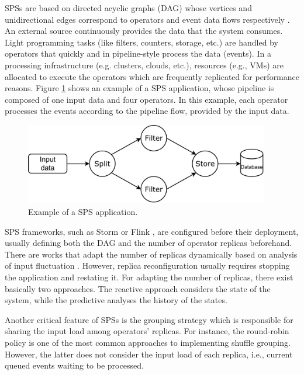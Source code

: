 SPSs are based on directed acyclic graphs (DAG) whose vertices and unidirectional edges correspond to operators and event data flows respectively \cite{ChakravarthyJ09}. An external source continuously provides the data that the system consumes. Light programming tasks (like filters, counters, storage, etc.) are handled by operators that quickly and in pipeline-style process the data (events). In a processing infrastructure (e.g. clusters, clouds, etc.), resources (e.g., VMs) are allocated to execute the operators which are frequently replicated for performance reasons. Figure \ref{fig:sps-introduction} shows an example of a SPS application, whose pipeline is composed of one input data and four operators. In this example, each operator processes the events according to the pipeline flow, provided by the input data.

\begin{figure}[!ht]
    \centering
    \includegraphics[width=0.95\textwidth]{figures/concepts/SPS-Introduction.pdf}
    \caption{Example of a SPS application.}
    \label{fig:sps-introduction}
\end{figure}

SPS frameworks, such as Storm \citep{Leibiusky0030281} or Flink \citep{CarboneKEMHT15}, are configured before their deployment, usually defining both the DAG and the number of operator replicas beforehand. There are works that adapt the number of replicas dynamically based on analysis of input fluctuation \citep{CardelliniPNR18, arkian2021model, KombiLLRB19}. However, replica reconfiguration usually requires stopping the application and restating it. For adapting the number of replicas, there exist basically two approaches. The reactive approach considers the state of the system, while the predictive analyses the history of the states.

Another critical feature of SPSs is the grouping strategy which is responsible for sharing the input load among operators' replicas. For instance, the round-robin policy is one of the most common approaches to implementing shuffle grouping.  However, the latter does not consider the input load of each replica, i.e., current queued events waiting to be processed.

